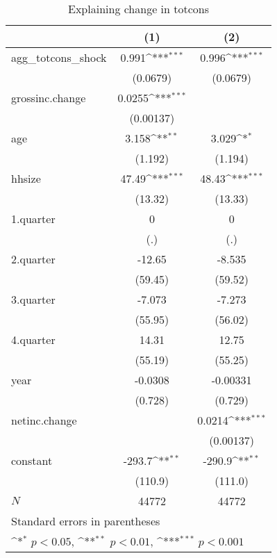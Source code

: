 \begin{table}[htbp]\centering
\def\sym#1{\ifmmode^{#1}\else\(^{#1}\)\fi}
\caption{\label{tab:totcons-deltacons} Explaining change in totcons}
\begin{tabular}{l*{2}{c}}
\hline\hline
            &\multicolumn{1}{c}{(1)}         &\multicolumn{1}{c}{(2)}         \\
\hline
agg\_totcons\_shock&       0.991\sym{***}&       0.996\sym{***}\\
            &    (0.0679)         &    (0.0679)         \\
grossinc.change&      0.0255\sym{***}&                     \\
            &   (0.00137)         &                     \\
age         &       3.158\sym{**} &       3.029\sym{*}  \\
            &     (1.192)         &     (1.194)         \\
hhsize      &       47.49\sym{***}&       48.43\sym{***}\\
            &     (13.32)         &     (13.33)         \\
1.quarter   &           0         &           0         \\
            &         (.)         &         (.)         \\
2.quarter   &      -12.65         &      -8.535         \\
            &     (59.45)         &     (59.52)         \\
3.quarter   &      -7.073         &      -7.273         \\
            &     (55.95)         &     (56.02)         \\
4.quarter   &       14.31         &       12.75         \\
            &     (55.19)         &     (55.25)         \\
year        &     -0.0308         &    -0.00331         \\
            &     (0.728)         &     (0.729)         \\
netinc.change&                     &      0.0214\sym{***}\\
            &                     &   (0.00137)         \\
constant    &      -293.7\sym{**} &      -290.9\sym{**} \\
            &     (110.9)         &     (111.0)         \\
\hline
\(N\)       &       44772         &       44772         \\
\hline\hline
\multicolumn{3}{l}{\footnotesize Standard errors in parentheses}\\
\multicolumn{3}{l}{\footnotesize \sym{*} \(p<0.05\), \sym{**} \(p<0.01\), \sym{***} \(p<0.001\)}\\
\end{tabular}
\end{table}
